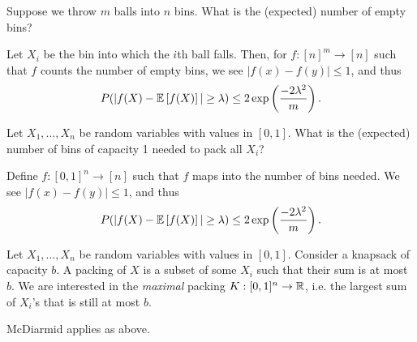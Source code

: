 
\begin{problem}
Suppose we throw $m$ balls into $n$ bins.
What is the (expected) number of empty bins?
\end{problem}
Let $X_i$ be the bin into which the $i$th ball falls.
Then, for $f : [n]^m \rightarrow [n]$ such that $f$ counts the number of empty bins,
we see $|f(x) - f(y)| \leq 1$, and thus
\begin{align*}
    P(|f(X) - \mathbb{E}\left[f(X)\right]| \geq \lambda) \leq 2 \exp\left(\frac{-2\lambda^2}{m}\right).
\end{align*}
\begin{problem}
Let $X_1, \dots, X_n$ be random variables with values in $[0,1]$.
What is the (expected) number of bins of capacity 1 needed to pack all $X_i$?
\end{problem}
Define $f : [0,1]^n \rightarrow [n]$ such that $f$ maps into the number of bins needed.
We see $|f(x) - f(y)| \leq 1$, and thus
\begin{align*}
    P(|f(X) - \mathbb{E}\left[f(X)\right]| \geq \lambda) \leq 2 \exp\left(\frac{-2\lambda^2}{m}\right).
\end{align*}
\begin{problem}
Let $X_1, \dots, X_n$ be random variables with values in $[0,1]$.
Consider a knapsack of capacity $b$.
A packing of $X$ is a subset of some $X_i$ such that their sum is at most $b$.
We are interested in the \emph{maximal} packing $K:[0,1]^n \rightarrow \mathbb{R}$,
i.e. the largest sum of $X_i$'s that is still at most $b$.
\end{problem}
McDiarmid applies as above.

